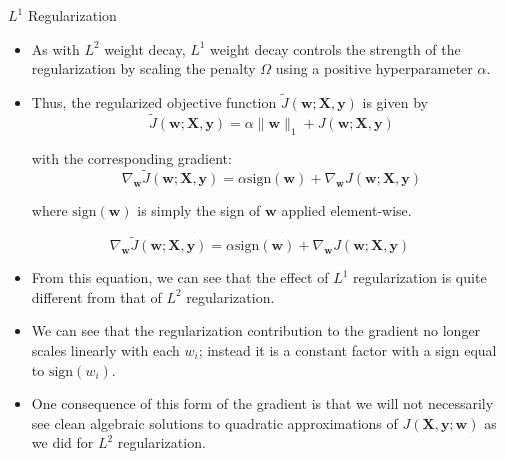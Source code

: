 \documentclass[10pt]{beamer}
\begin{document}
	\begin{frame}{$L^1$ Regularization}
		\begin{itemize}
			\item As with $L^2$ weight decay, $L^1$ weight decay controls the strength of the regularization by scaling the penalty $\Omega$ using a positive hyperparameter $\alpha$.
			\pause
			\item Thus, the regularized objective function $\tilde{J}(\bm{w};\bm{X},\bm{y})$ is given by
			$$\tilde{J}(\bm{w};\bm{X},\bm{y})=\alpha\lVert\bm{w}\rVert_1+J(\bm{w;\bm{X},\bm{y}})$$
			
			\pause
			with the corresponding gradient:
			$$\nabla_{\bm{w}}\tilde{J}(\bm{w};\bm{X},\bm{y})=\alpha\mathrm{sign}(\bm{w})+\nabla_{\bm{w}}J(\bm{w};\bm{X},\bm{y})$$
			
			\pause
			where $\mathrm{sign}(\bm{w})$ is simply the sign of $\bm{w}$ applied element-wise.
			
		\end{itemize}
	\end{frame}

	\begin{frame}{}
		$$\nabla_{\bm{w}}\tilde{J}(\bm{w};\bm{X},\bm{y})=\alpha\mathrm{sign}(\bm{w})+\nabla_{\bm{w}}J(\bm{w};\bm{X},\bm{y})$$
		\begin{itemize}
			\item From this equation, we can see that the effect of $L^1$ regularization is quite different from that of $L^2$ regularization.
			\pause
			\item We can see that the regularization contribution to the gradient no longer scales linearly with each $w_i$; instead it is a constant factor with a sign equal to $\mathrm{sign}(w_i)$.
			\pause
			\item One consequence of this form of the gradient is that we will not necessarily see clean algebraic solutions to quadratic approximations of $J(\bm{X},\bm{y};\bm{w})$ as we did for $L^2$ regularization.
		\end{itemize}
	\end{frame}
	
\end{document}
